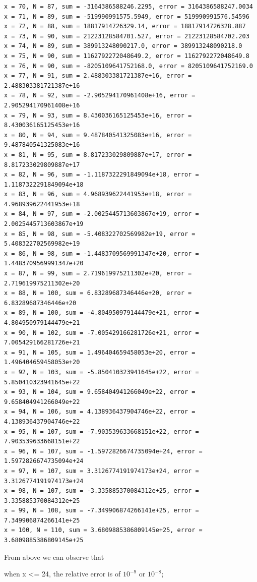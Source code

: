\documentclass{article}
\begin{document}
\begin{lstlisting}
x = 70, N = 87, sum = -3164386588246.2295, error = 3164386588247.0034
x = 71, N = 89, sum = -519990991575.5949, error = 519990991576.54596
x = 72, N = 88, sum = 18817914726329.14, error = 18817914726328.887
x = 73, N = 90, sum = 21223128584701.527, error = 21223128584702.203
x = 74, N = 89, sum = 389913248090217.0, error = 389913248090218.0
x = 75, N = 90, sum = 1162792272048649.2, error = 1162792272048649.8
x = 76, N = 90, sum = -8205109641752168.0, error = 8205109641752169.0
x = 77, N = 91, sum = 2.488303381721387e+16, error = 2.488303381721387e+16
x = 78, N = 92, sum = -2.905294170961408e+16, error = 2.905294170961408e+16
x = 79, N = 93, sum = 8.430036165125453e+16, error = 8.430036165125453e+16
x = 80, N = 94, sum = 9.487840541325083e+16, error = 9.487840541325083e+16
x = 81, N = 95, sum = 8.817233029809887e+17, error = 8.817233029809887e+17
x = 82, N = 96, sum = -1.1187322291849094e+18, error = 1.1187322291849094e+18
x = 83, N = 96, sum = 4.968939622441953e+18, error = 4.968939622441953e+18
x = 84, N = 97, sum = -2.0025445713603867e+19, error = 2.0025445713603867e+19
x = 85, N = 98, sum = -5.408322702569982e+19, error = 5.408322702569982e+19
x = 86, N = 98, sum = -1.4483709569991347e+20, error = 1.4483709569991347e+20
x = 87, N = 99, sum = 2.719619975211302e+20, error = 2.719619975211302e+20
x = 88, N = 100, sum = 6.83289687346446e+20, error = 6.83289687346446e+20
x = 89, N = 100, sum = -4.804950979144479e+21, error = 4.804950979144479e+21
x = 90, N = 102, sum = -7.005429166281726e+21, error = 7.005429166281726e+21
x = 91, N = 105, sum = 1.496404659458053e+20, error = 1.496404659458053e+20
x = 92, N = 103, sum = -5.850410323941645e+22, error = 5.850410323941645e+22
x = 93, N = 104, sum = 9.658404941266049e+22, error = 9.658404941266049e+22
x = 94, N = 106, sum = 4.138936437904746e+22, error = 4.138936437904746e+22
x = 95, N = 107, sum = -7.903539633668151e+22, error = 7.903539633668151e+22
x = 96, N = 107, sum = -1.5972826674735094e+24, error = 1.5972826674735094e+24
x = 97, N = 107, sum = 3.3126774191974173e+24, error = 3.3126774191974173e+24
x = 98, N = 107, sum = -3.335885370084312e+25, error = 3.335885370084312e+25
x = 99, N = 108, sum = -7.349906874266141e+25, error = 7.349906874266141e+25
x = 100, N = 110, sum = 3.6809885386809145e+25, error = 3.6809885386809145e+25

\end{lstlisting}

From above we can observe that 

when x <= 24, the relative error is of $10^{-9}$ or $10^{-8}$;
\end{document}
